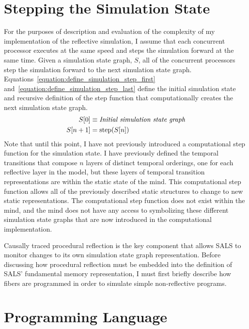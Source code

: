 \section{Stepping the Simulation State}

For the purposes of description and evaluation of the complexity of my
implementation of the reflective simulation, I assume that each
concurrent processor executes at the same speed and steps the
simulation forward at the same time.  Given a simulation state graph,
$S$, all of the concurrent processors step the simulation forward to
the next simulation state graph.
Equations\ \ref{equation:define_simulation_step_first}
and\ \ref{equation:define_simulation_step_last} define the initial
simulation state and recursive definition of the step function that
computationally creates the next simulation state graph.
\begin{align}
\label{equation:define_simulation_step_first}
    S[0] &\equiv \text{\emph{Initial simulation state graph}} \\
\label{equation:define_simulation_step_last}
  S[n+1] &= \text{step}(S[n])
\end{align}
Note that until this point, I have not previously introduced a
computational step function for the simulation state.  I have
previously defined the temporal transitions that compose $n$ layers of
distinct temporal orderings, one for each reflective layer in the
model, but these layers of temporal transition representations are
within the static state of the mind.  This computational step function
allows all of the previously described static structures to change to
new static representations.  The computational step function does not
exist within the mind, and the mind does not have any access to
symbolizing these different simulation state graphs that are now
introduced in the computational implementation.

Causally traced procedural reflection is the key component that allows
SALS to monitor changes to its own simulation state graph
representation.  Before discussing how procedural reflection must be
embedded into the definition of SALS' fundamental memory
representation, I must first briefly describe how fibers are
programmed in order to simulate simple non-reflective programs.

\section{Programming Language}

